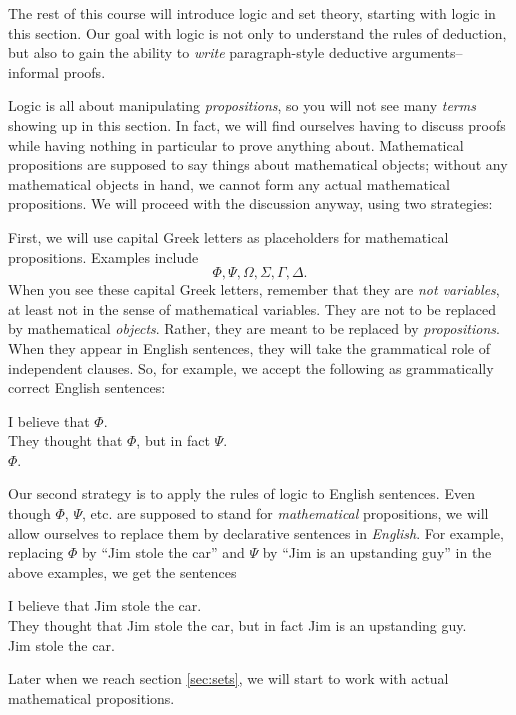 \documentclass[12pt]{article}
\newcounter{rule}
\def\pA{\Phi}
\def\pB{\Psi}
\def\pC{\Omega}
\def\pD{\Sigma}
\def\pE{\Gamma}
\def\pF{\Delta}
\begin{document}
The rest of this course will introduce logic and set theory, starting with logic in this section.
Our goal with logic is not only to understand the rules of deduction,
but also to gain the ability to \emph{write} paragraph-style deductive arguments-- informal proofs.

Logic is all about manipulating \emph{propositions}, so you will not see many \emph{terms} showing up in this section.
In fact, we will find ourselves having to discuss proofs while having nothing in particular to prove anything about.
Mathematical propositions are supposed to say things about mathematical objects;
without any mathematical objects in hand, we cannot form any actual mathematical propositions.
We will proceed with the discussion anyway, using two strategies:

First, we will use capital Greek letters as placeholders for mathematical propositions. Examples include
$$
\pA,
\pB,
\pC,
\pD,
\pE,
\pF.
$$
When you see these capital Greek letters, remember that they are \emph{not variables},
at least not in the sense of mathematical variables. They are not to be replaced by mathematical \emph{objects}.
Rather, they are meant to be replaced by \emph{propositions}.
When they appear in English sentences, they will take the grammatical role of independent clauses.
So, for example, we accept the following as grammatically correct English sentences:
\begin{adjustwidth}{2em}{}
I believe that $\pA$.\\
They thought that $\pA$, but in fact $\pB$.\\
$\pA$.
\end{adjustwidth}

Our second strategy
is to apply the rules of logic to English sentences.
Even though $\pA$, $\pB$, etc. are supposed to stand for \emph{mathematical} propositions,
we will allow ourselves to replace them by declarative sentences in \emph{English}.
For example, replacing $\pA$ by ``Jim stole the car'' and $\pB$ by ``Jim is an upstanding guy'' in the above examples, we get the sentences
\begin{adjustwidth}{2em}{}
I believe that Jim stole the car.\\
They thought that Jim stole the car, but in fact Jim is an upstanding guy.\\
Jim stole the car.
\end{adjustwidth}
Later when we reach section
\ref{sec:sets}, we will start to work with actual mathematical propositions.
\end{document}
